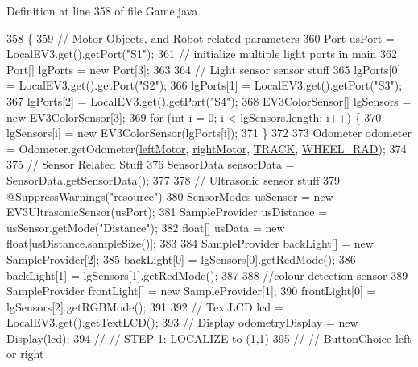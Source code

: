 Definition at line 358 of file Game.\+java.


\begin{DoxyCode}
358                                                       \{
359     \textcolor{comment}{// Motor Objects, and Robot related parameters}
360     Port usPort = LocalEV3.get().getPort(\textcolor{stringliteral}{"S1"});
361     \textcolor{comment}{// initialize multiple light ports in main}
362     Port[] lgPorts = \textcolor{keyword}{new} Port[3];
363 
364     \textcolor{comment}{// Light sensor sensor stuff}
365     lgPorts[0] = LocalEV3.get().getPort(\textcolor{stringliteral}{"S2"});
366     lgPorts[1] = LocalEV3.get().getPort(\textcolor{stringliteral}{"S3"});
367     lgPorts[2] = LocalEV3.get().getPort(\textcolor{stringliteral}{"S4"});
368     EV3ColorSensor[] lgSensors = \textcolor{keyword}{new} EV3ColorSensor[3];
369     \textcolor{keywordflow}{for} (\textcolor{keywordtype}{int} i = 0; i < lgSensors.length; i++) \{
370       lgSensors[i] = \textcolor{keyword}{new} EV3ColorSensor(lgPorts[i]);
371     \}
372 
373     Odometer odometer = Odometer.getOdometer(\hyperlink{enumca_1_1mcgill_1_1ecse211_1_1project_1_1_game_a7c673571bf50fdb6917a9d7bb671e003}{leftMotor}, \hyperlink{enumca_1_1mcgill_1_1ecse211_1_1project_1_1_game_a7a05fcf37c4435c32270776a427ba0d2}{rightMotor}, 
      \hyperlink{enumca_1_1mcgill_1_1ecse211_1_1project_1_1_game_a64cf12cdd6772ac1ce351ff1dfadd626}{TRACK}, \hyperlink{enumca_1_1mcgill_1_1ecse211_1_1project_1_1_game_a91bd64670c2a91d006c907142783b1f8}{WHEEL\_RAD});
374 
375     \textcolor{comment}{// Sensor Related Stuff}
376     SensorData sensorData = SensorData.getSensorData();
377 
378     \textcolor{comment}{// Ultrasonic sensor stuff}
379     @SuppressWarnings(\textcolor{stringliteral}{"resource"})
380     SensorModes usSensor = new EV3UltrasonicSensor(usPort);
381     SampleProvider usDistance = usSensor.getMode("Distance");
382     \textcolor{keywordtype}{float}[] usData = new \textcolor{keywordtype}{float}[usDistance.sampleSize()];
383 
384     SampleProvider backLight[] = new SampleProvider[2];
385     backLight[0] = lgSensors[0].getRedMode();
386     backLight[1] = lgSensors[1].getRedMode();
387     
388     \textcolor{comment}{//colour detection sensor}
389     SampleProvider frontLight[] = new SampleProvider[1];
390     frontLight[0] = lgSensors[2].getRGBMode();
391 
392 \textcolor{comment}{//    TextLCD lcd = LocalEV3.get().getTextLCD();}
393 \textcolor{comment}{//    Display odometryDisplay = new Display(lcd);}
394 \textcolor{comment}{//    // STEP 1: LOCALIZE to (1,1)}
395 \textcolor{comment}{//    // ButtonChoice left or right}

\end{DoxyCode}
